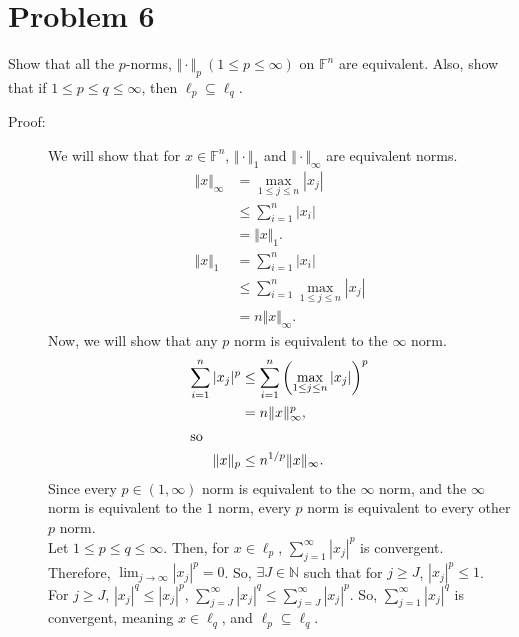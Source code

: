 \documentclass[10pt]{extarticle}
\newcommand{\N}{\mathbb{N}}
\begin{document}
  \section{Problem 6}%
  Show that all the $p$-norms, $\Vert \cdot \Vert_p~(1\leq p \leq \infty)$ on $\mathbb{F}^n$ are equivalent. Also, show that if $1\leq p \leq q \leq \infty$, then $\ell_p \subseteq \ell_q$.
  \begin{description}
    \item[Proof:] We will show that for $x\in \mathbb{F}^n$, $\Vert \cdot \Vert_1$ and $\Vert \cdot \Vert_{\infty}$ are equivalent norms.
      \begin{align*}
        \Vert x \Vert_{\infty} &= \max_{1\leq j \leq n}|x_j|\\
                               &\leq \sum_{i=1}^{n}|x_i|\\
                               &= \Vert x \Vert_1.\\
        \Vert x \Vert_{1} &= \sum_{i=1}^{n}|x_i|\\
                          &\leq \sum_{i=1}^{n}\max_{1\leq j \leq n}|x_j|\\
                          &= n\Vert x \Vert_{\infty}.
      \end{align*}
      Now, we will show that any $p$ norm is equivalent to the $\infty$ norm.
      \begin{align*}
        \sum_{i=1}^{n}|x_j|^p&\leq \sum_{i=1}^{n}\left(\max_{1\leq j\leq n}|x_j|\right)^p\\
                             &= n\Vert x\Vert_{\infty}^{p},\\
                             \shortintertext{so}
        \Vert x\Vert_{p} &\leq n^{1/p}\Vert x \Vert_{\infty}.
      \end{align*}
      Since every $p\in (1,\infty)$ norm is equivalent to the $\infty$ norm, and the $\infty$ norm is equivalent to the $1$ norm, every $p$ norm is equivalent to every other $p$ norm.\\

      Let $1\leq p \leq q \leq \infty$. Then, for $x\in \ell_{p}$, $\sum_{j=1}^{\infty} |x_j|^{p}$ is convergent.\\

      Therefore, $\lim_{j\rightarrow\infty} |x_j|^{p} = 0$. So, $\exists J\in \N$ such that for $j\geq J$, $|x_j|^{p} \leq 1$.\\

      For $j\geq J$, $|x_j|^q \leq |x_j|^{p}$, $\sum_{j=J}^{\infty}|x_j|^{q} \leq \sum_{j=J}^{\infty}|x_j|^{p}$. So, $\sum_{j=1}^{\infty}|x_j|^{q}$ is convergent, meaning $x\in \ell_{q}$, and $\ell_{p} \subseteq \ell_{q}$.
  \end{description}
\end{document}
